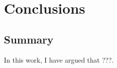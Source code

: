 \chapter{Conclusions}
\label{chapter:conclusion}

\section{Summary}
In this work, I have argued that ???.